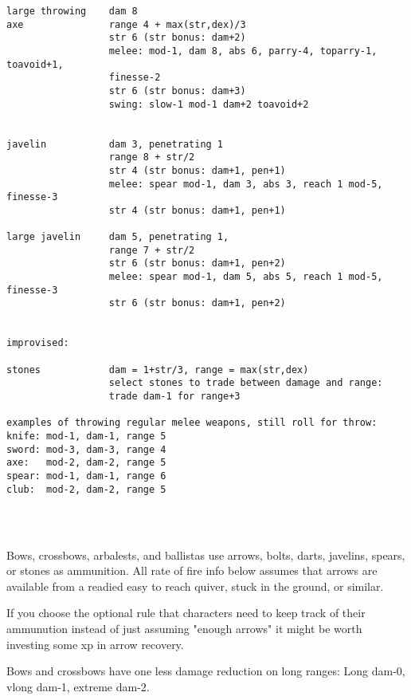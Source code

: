 \begin{verbatim}
large throwing    dam 8
axe               range 4 + max(str,dex)/3
                  str 6 (str bonus: dam+2)
                  melee: mod-1, dam 8, abs 6, parry-4, toparry-1, toavoid+1, 
                  finesse-2
                  str 6 (str bonus: dam+3)
                  swing: slow-1 mod-1 dam+2 toavoid+2


javelin           dam 3, penetrating 1
                  range 8 + str/2
                  str 4 (str bonus: dam+1, pen+1)
                  melee: spear mod-1, dam 3, abs 3, reach 1 mod-5, finesse-3
                  str 4 (str bonus: dam+1, pen+1)

large javelin     dam 5, penetrating 1,
                  range 7 + str/2
                  str 6 (str bonus: dam+1, pen+2)
                  melee: spear mod-1, dam 5, abs 5, reach 1 mod-5, finesse-3
                  str 6 (str bonus: dam+1, pen+2)


improvised:

stones            dam = 1+str/3, range = max(str,dex) 
                  select stones to trade between damage and range:
                  trade dam-1 for range+3

examples of throwing regular melee weapons, still roll for throw:
knife: mod-1, dam-1, range 5
sword: mod-3, dam-3, range 4
axe:   mod-2, dam-2, range 5
spear: mod-1, dam-1, range 6
club:  mod-2, dam-2, range 5


\end{verbatim} \goodbreak \normalsize

\

\noindent Bows, crossbows, arbalests, and ballistas use arrows, bolts, darts, javelins, spears, or stones as ammunition. All rate of fire info below assumes that arrows are available from a readied easy to reach quiver, stuck in the ground, or similar.

If you choose the optional rule that characters need to keep track of their ammunution instead of just assuming "enough arrows" it might be worth investing some xp in arrow recovery.

Bows and crossbows have one less damage reduction on long ranges: Long dam-0, vlong dam-1, extreme dam-2.

\

